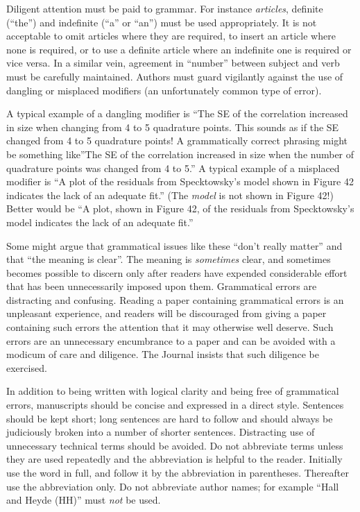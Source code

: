 \documentclass[
doublespace,
  times]{anzsauth}
\begin{document}
Diligent attention must be paid to grammar. For instance
\emph{articles}, definite (``the'') and indefinite (``a'' or ``an'')
must be used appropriately. It is not acceptable to omit articles where
they are required, to insert an article where none is required, or to
use a definite article where an indefinite one is required or vice
versa. In a similar vein, agreement in ``number'' between subject and
verb must be carefully maintained. Authors must guard vigilantly against
the use of dangling or misplaced modifiers (an unfortunately common type
of error).

A typical example of a dangling modifier is ``The SE of the correlation
increased in size when changing from 4 to 5 quadrature points. This
sounds as if the SE changed from 4 to 5 quadrature points! A
grammatically correct phrasing might be something like''The SE of the
correlation increased in size when the number of quadrature points was
changed from 4 to 5.'' A typical example of a misplaced modifier is ``A
plot of the residuals from Specktowsky's model shown in Figure 42
indicates the lack of an adequate fit.'' (The \emph{model} is not shown
in Figure 42!) Better would be ``A plot, shown in Figure 42, of the
residuals from Specktowsky's model indicates the lack of an adequate
fit.''

Some might argue that grammatical issues like these ``don't really
matter'' and that ``the meaning is clear''. The meaning is
\emph{sometimes} clear, and sometimes becomes possible to discern only
after readers have expended considerable effort that has been
unnecessarily imposed upon them. Grammatical errors are distracting and
confusing. Reading a paper containing grammatical errors is an
unpleasant experience, and readers will be discouraged from giving a
paper containing such errors the attention that it may otherwise well
deserve. Such errors are an unnecessary encumbrance to a paper and can
be avoided with a modicum of care and diligence. The Journal insists
that such diligence be exercised.

In addition to being written with logical clarity and being free of
grammatical errors, manuscripts should be concise and expressed in a
direct style. Sentences should be kept short; long sentences are hard to
follow and should always be judiciously broken into a number of shorter
sentences. Distracting use of unnecessary technical terms should be
avoided. Do not abbreviate terms unless they are used repeatedly and the
abbreviation is helpful to the reader. Initially use the word in full,
and follow it by the abbreviation in parentheses. Thereafter use the
abbreviation only. Do not abbreviate author names; for example ``Hall
and Heyde (HH)'' must \emph{not} be used.
\end{document}
